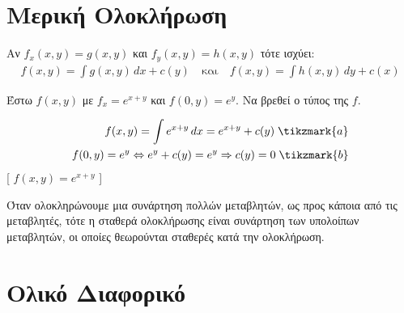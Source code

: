 
\section{Μερική Ολοκλήρωση}

\begin{rem}
\item {}
  Αν $ f_{x}(x,y) = g(x,y)$ και $ f_{y}(x,y)=h(x,y) $ τότε ισχύει:
  \begin{align*}
    f(x,y) = \int g(x,y) \,{dx} + c(y) \quad \text{και} \quad f(x,y) = 
    \int h(x,y) \,{dy} + c(x) 
  \end{align*} 
\end{rem}

\begin{example}
\item {}
  Έστω $ f(x,y)$ με $ f_{x}=e^{x+y} $ και $ f(0,y)=e^{y} $. 
  Να βρεθεί ο τύπος της $f$.
  \begin{solution}
    \begin{align*}
      f(x,y) = \int e^{x+y} \,{dx} = e^{x+y} + c(y) \; \tikzmark{a} \\ 
      f(0,y) = e^{y} \Leftrightarrow e^{y}+ c(y) = e^{y} \Rightarrow c(y) = 0 
      \; \tikzmark{b}
    \end{align*}
    [ $f(x,y) = e^{x+y}$ ]
  \end{solution}
\end{example}

\begin{rem}
  Όταν ολοκληρώνουμε μια συνάρτηση πολλών μεταβλητών, ως προς κάποια από τις 
  μεταβλητές, τότε η σταθερά ολοκλήρωσης είναι συνάρτηση των υπολοίπων μεταβλητών, 
  οι οποίες θεωρούνται σταθερές κατά την ολοκλήρωση.
\end{rem}

\section{Ολικό Διαφορικό}


